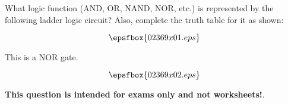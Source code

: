 

What logic function (AND, OR, NAND, NOR, etc.) is represented by the following ladder logic circuit?  Also, complete the truth table for it as shown:

$$\epsfbox{02369x01.eps}$$







This is a NOR gate.

$$\epsfbox{02369x02.eps}$$







{\bf This question is intended for exams only and not worksheets!}.




